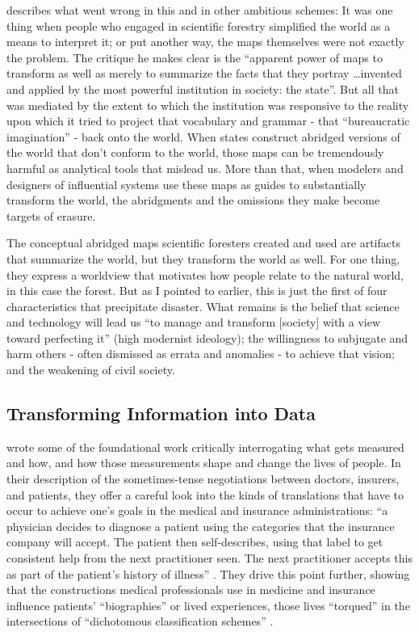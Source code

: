 \documentclass[manuscript,screen]{acmart}
\begin{document}
\citeauthor{scott1998seeing} describes what went wrong in this and in other ambitious schemes: It was one thing when people who engaged in scientific forestry simplified the world as a means to interpret it;
or put another way, the maps themselves were not exactly the problem.
The critique he makes clear is the ``apparent power of maps to transform as well as merely to summarize the facts that they portray \dots invented and applied by the most powerful institution in society: the state''.
But all that was mediated by the extent to which the institution was responsive to the reality upon which it tried to project that vocabulary and grammar - that ``bureaucratic imagination''
\cite{nuimeprn1123} - back onto the world.
When states construct abridged versions of the world that don't conform to the world, those maps can be tremendously harmful as analytical tools that mislead us.
More than that, when modelers and designers of influential systems use these maps as guides to substantially transform the world, the abridgments and the omissions they make become targets of erasure.

The conceptual abridged maps scientific foresters created and used are artifacts that summarize the world, but they transform the world as well.
For one thing, they express a worldview that motivates how people relate to the natural world, in this case the forest.
But as I pointed to earlier, this is just the first of four characteristics that precipitate disaster.
What remains is the belief that science and technology will lead us ``to manage and transform [society] with a view toward perfecting it'' (high modernist ideology);
the willingness to subjugate and harm others - often dismissed as errata and anomalies - to achieve that vision;
and the weakening of civil society.

\subsection{Transforming Information into Data}

\citeauthor{bowker2000sorting} wrote some of the foundational work critically interrogating what gets measured and how, and how those measurements shape and change the lives of people.
In their description of the sometimes-tense negotiations between doctors, insurers, and patients, they offer a careful look into the kinds of translations that have to occur to achieve one's goals in the medical and insurance administrations:
``a physician decides to diagnose a patient using the categories that the insurance company will accept.
The patient then self-describes, using that label to get consistent help from the next practitioner seen.
The next practitioner accepts this as part of the patient's history of illness''
\cite{bowker2000sorting}.
They drive this point further, showing that the constructions medical professionals use in medicine and insurance influence patients' ``biographies'' or lived experiences, those lives ``torqued'' in the intersections of ``dichotomous classification schemes''
\cite{bowker2000sorting}.
\end{document}
